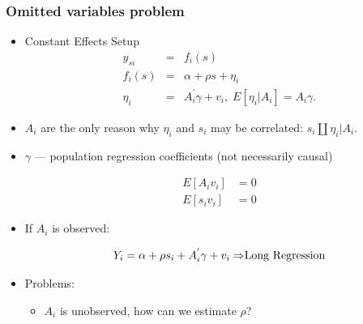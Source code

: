 \documentclass[pdftex]{beamer}
\begin{document}
\begin{frame}
\frametitle{Omitted variables problem}
\begin{itemize}
\item Constant Effects Setup
\begin{eqnarray*}
	y_{si} &=& f_{i}\left(s\right) \\
  f_{i}\left(s\right) &=& \alpha+ \rho s+ \eta_{i} \\
  \eta_{i} &=& A_{i}^{'}\gamma+v_i,\;E[\eta_i|A_i] = A_i\gamma.
\end{eqnarray*}
\item $A_{i}$ are the only reason why $\eta_{i}$ and $s_{i}$ may be correlated: $s_i\amalg\eta_i |A_i$.
\item $\gamma$ --- population regression coefficients (not necessarily causal)


\[\begin{array}{cl}
    E\left[A_{i}v_{i}\right]&= 0\\
    E\left[s_{i}v_{i}\right]&= 0
    \end{array}
\]

\item If $A_{i}$ is observed:


\[\begin{array}{cl}
   Y_{i} =  \alpha+ \rho s_{i}+ A_{i}^{'}\gamma+v_{i} \Rightarrow $Long Regression$

    \end{array}
\]

\item Problems:
\begin {itemize}

   \item $A_{i}$ is unobserved, how can we estimate $\rho$?
\end{itemize}
\end{itemize}
\end{frame}



\end{document}
